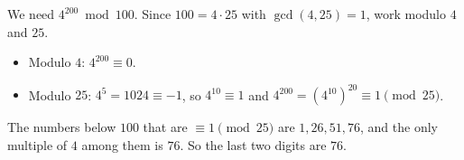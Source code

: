 We need $4^{200}\bmod100$. Since $100=4\cdot25$ with $\gcd(4,25)=1$, work modulo $4$ and $25$.
\begin{itemize}
\item Modulo $4$: $4^{200}\equiv0$.
\item Modulo $25$: $4^5=1024\equiv-1$, so $4^{10}\equiv1$ and $4^{200}=\left(4^{10}\right)^{20}\equiv1\pmod{25}$.
\end{itemize}
The numbers below $100$ that are $\equiv1\pmod{25}$ are $1,26,51,76$, and the only multiple of $4$ among them is $76$. So the last two digits are $\boxed{76}$.
